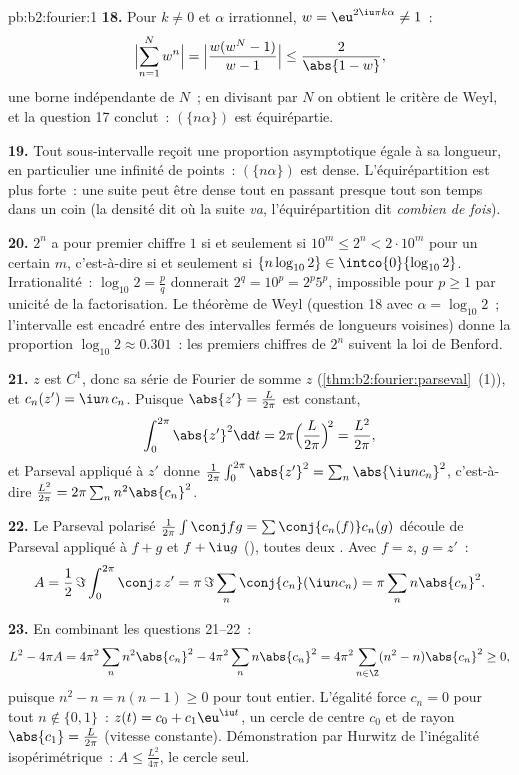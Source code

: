 \begin{solution}{pb:b2:fourier:1}
\textbf{18.} Pour $k \neq 0$ et $\alpha$ irrationnel, $w =
\eu^{2\iu\pi k\alpha} \neq 1$~:
\[
\Bigl|\sum_{n=1}^{N}w^n\Bigr|
= \Bigl|\frac{w(w^N - 1)}{w - 1}\Bigr|
\leq \frac{2}{\abs{1 - w}} ,
\]
une borne indépendante de $N$~; en divisant par $N$ on obtient le
critère de Weyl, et la question 17 conclut~: $(\{n\alpha\})$ est
équirépartie.

\textbf{19.} Tout sous-intervalle reçoit une proportion asymptotique
égale à sa longueur, en particulier une infinité de points~:
$(\{n\alpha\})$ est dense. L'équirépartition est plus forte~: une
suite peut être dense tout en passant presque tout son temps dans un
coin (la densité dit où la suite \emph{va}, l'équirépartition dit
\emph{combien de fois}).

\textbf{20.} $2^n$ a pour premier chiffre $1$ si et seulement si
$10^m \leq 2^n < 2\cdot10^m$ pour un certain $m$, c'est-à-dire si et
seulement si $\{n\log_{10}2\} \in \intco{0}{\log_{10}2}$.
Irrationalité~: $\log_{10}2 = \frac pq$ donnerait $2^q = 10^p =
2^p5^p$, impossible pour $p \geq 1$ par unicité de la
factorisation. Le théorème de Weyl (question 18 avec $\alpha =
\log_{10}2$~; l'intervalle  est encadré entre des
intervalles fermés de longueurs voisines) donne la proportion
$\log_{10}2 \approx 0.301$~: les premiers chiffres de $2^n$ suivent
la loi de Benford.

\textbf{21.} $z$ est $C^1$, donc sa série de Fourier 
 de somme $z$ (\cref{thm:b2:fourier:parseval}~(1)), et
$c_n(z') = \iu n\,c_n$. Puisque $\abs{z'} = \frac{L}{2\pi}$ est
constant,
\[
\int_0^{2\pi}\abs{z'}^2\dd t
= 2\pi\Bigl(\frac{L}{2\pi}\Bigr)^{\!2}
= \frac{L^2}{2\pi} ,
\]
et Parseval appliqué à $z'$  donne
$\frac{1}{2\pi}\int_0^{2\pi}\abs{z'}^2 =
\sum_n\abs{\iu nc_n}^2$, c'est-à-dire $\frac{L^2}{2\pi} = 2\pi\sum_n
n^2\abs{c_n}^2$.

\textbf{22.} Le Parseval polarisé $\frac{1}{2\pi}\int\conj
fg = \sum\conj{c_n(f)}c_n(g)$ découle de Parseval appliqué à
$f + g$ et $f + \iu g$ (), toutes deux
. Avec $f = z$, $g = z'$~:
\[
A = \frac12\,\Im\int_0^{2\pi}\conj z\,z'
= \pi\,\Im\sum_n\conj{c_n}(\iu n c_n)
= \pi\sum_n n\abs{c_n}^2 .
\]

\textbf{23.} En combinant les questions 21--22~:
\[
L^2 - 4\pi A
= 4\pi^2\sum_n n^2\abs{c_n}^2 -
4\pi^2\sum_n n\abs{c_n}^2
= 4\pi^2\sum_{n\in\Z}(n^2 - n)\abs{c_n}^2 \geq 0 ,
\]
puisque $n^2 - n = n(n-1) \geq 0$ pour tout entier. L'égalité force
$c_n = 0$ pour tout $n \notin \{0, 1\}$~: $z(t) = c_0 +
c_1\eu^{\iu t}$, un cercle de centre $c_0$ et de rayon
$\abs{c_1} = \frac{L}{2\pi}$ (vitesse constante). Démonstration par
Hurwitz de l'inégalité isopérimétrique~: $A \leq \frac{L^2}{4\pi}$,
le cercle seul.


\end{solution}
